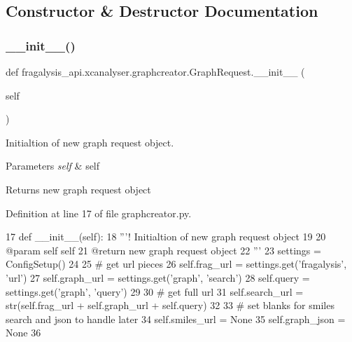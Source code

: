 \subsection{Constructor \& Destructor Documentation}
\mbox{\label{classfragalysis__api_1_1xcanalyser_1_1graphcreator_1_1_graph_request_ac2cce029ca7a29dab5625823e2eb92c2}} 
\subsubsection{\texorpdfstring{\+\_\+\+\_\+init\+\_\+\+\_\+()}{\_\_init\_\_()}}
{\footnotesize\ttfamily def fragalysis\+\_\+api.\+xcanalyser.\+graphcreator.\+Graph\+Request.\+\_\+\+\_\+init\+\_\+\+\_\+ (\begin{DoxyParamCaption}\item[{}]{self }\end{DoxyParamCaption})}



Initialtion of new graph request object. 


\begin{DoxyParams}{Parameters}
{\em self} & self \\
\hline
\end{DoxyParams}
\begin{DoxyReturn}{Returns}
new graph request object 
\end{DoxyReturn}


Definition at line 17 of file graphcreator.\+py.


\begin{DoxyCode}
17     \textcolor{keyword}{def }\_\_init\_\_(self):
18         \textcolor{stringliteral}{'''! Initialtion of new graph request object}
19 \textcolor{stringliteral}{}
20 \textcolor{stringliteral}{        @param self self}
21 \textcolor{stringliteral}{        @return new graph request object}
22 \textcolor{stringliteral}{        '''}
23         settings = ConfigSetup()
24 
25         \textcolor{comment}{# get url pieces}
26         self.frag\_url = settings.get(\textcolor{stringliteral}{'fragalysis'}, \textcolor{stringliteral}{'url'})
27         self.graph\_url = settings.get(\textcolor{stringliteral}{'graph'}, \textcolor{stringliteral}{'search'})
28         self.query = settings.get(\textcolor{stringliteral}{'graph'}, \textcolor{stringliteral}{'query'})
29 
30         \textcolor{comment}{# get full url}
31         self.search\_url = str(self.frag\_url + self.graph\_url + self.query)
32 
33         \textcolor{comment}{# set blanks for smiles search and json to handle later}
34         self.smiles\_url = \textcolor{keywordtype}{None}
35         self.graph\_json = \textcolor{keywordtype}{None}
36 
\end{DoxyCode}


